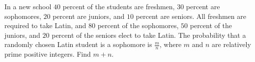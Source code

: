 In a new school $40$ percent of the students are freshmen, $30$ percent are sophomores, $20$ percent are juniors, and $10$ percent are seniors.  All freshmen are required to take Latin, and $80$ percent of the sophomores, $50$ percent of the juniors, and $20$ percent of the seniors elect to take Latin. The probability that a randomly chosen Latin student is a sophomore is $\frac{m}{n}$,  where $m$ and $n$ are relatively prime positive integers. Find $m+n$.